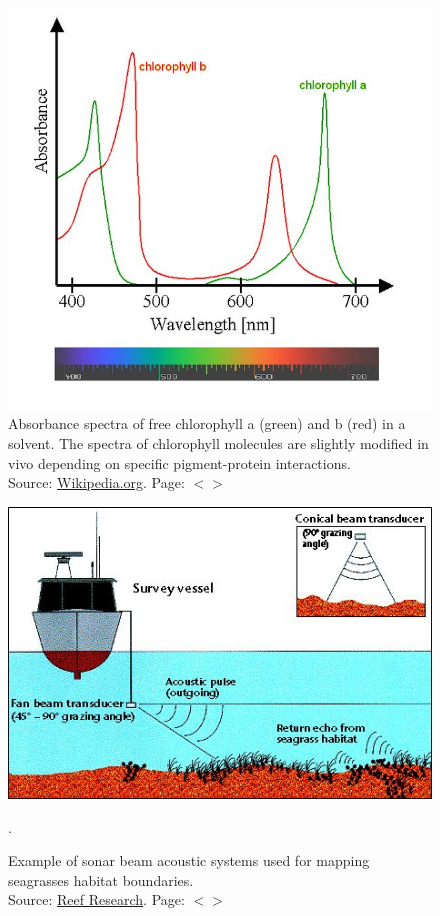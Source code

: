 \documentclass[11pt]{article}
\begin{document}
\begin{appendices}
\begin{figure}[H]
	\begin{center}
		\includegraphics[scale=0.6]{Chlorophyll.jpg}
		\caption{Absorbance spectra of free chlorophyll a (green) and b (red) in a solvent. The spectra of chlorophyll molecules are slightly modified in vivo depending on specific pigment-protein interactions. \\ Source: \href{http://en.wikipedia.org/wiki/Portal:Contents/Quick_index}{Wikipedia.org}. Page: $<$\pageref{chlorophyll}$>$}\label{fig:A.2-2}
	\end{center}
\end{figure}

\begin{figure}[H]
	\begin{center}
		\includegraphics[scale=0.6]{sonar.jpg}
		\caption{Example of sonar beam acoustic systems used for
mapping seagrasses habitat boundaries. \\ Source: \href{http://kurrawa.gbrmpa.gov.au/corp_site/info_services/publications/reef_research/issue1_98/1wot.html}{Reef Research}. Page: $<$\pageref{page-15}$>$}.\label{fig:sonar}
	\end{center}
\end{figure}


\end{appendices}
\end{document}
